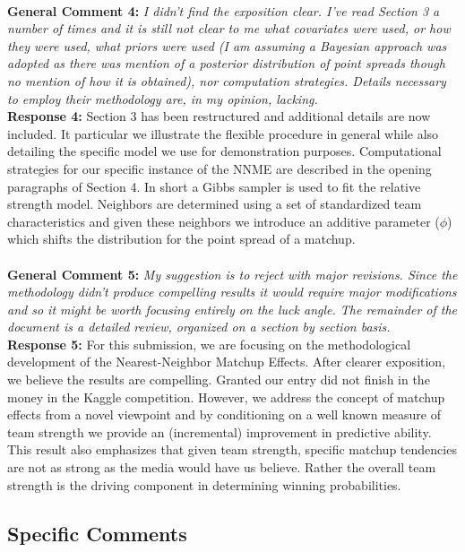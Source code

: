 \documentclass[11pt]{article} %
\begin{document}
\\
{\bf General Comment 4:} \emph{I didn't find the exposition clear. I've read Section 3 a number of times and it is still not clear to me what covariates were used, or how they were used, what priors were used (I am assuming a Bayesian approach was adopted as there was mention of a posterior distribution of point spreads though no mention of how it is obtained), nor computation strategies. Details necessary to employ their methodology are, in my opinion, lacking.}\\
{\bf Response 4:} Section 3 has been restructured and additional details are now included. It particular we illustrate the flexible procedure in general while also detailing the specific model we use for demonstration purposes. Computational strategies for our specific instance of the NNME are described in the opening paragraphs of Section 4. In short a Gibbs sampler is used to fit the relative strength model. Neighbors are determined using a set of standardized team characteristics and given these neighbors we introduce an additive parameter ($\phi$) which shifts the distribution for the point spread of a matchup.\\
\\
{\bf General Comment 5:} \emph{My suggestion is to reject with major revisions. Since the methodology didn't produce compelling results it would require major modifications and so it might be worth focusing entirely on the luck angle. The remainder of the document is a detailed review, organized on a section by section basis.}\\
{\bf Response 5:} For this submission, we are focusing on the methodological development of the Nearest-Neighbor Matchup Effects. After clearer exposition, we believe the results are compelling. Granted our entry did not finish in the money in the Kaggle competition. However, we address the concept of matchup effects from a novel viewpoint and by conditioning on a well known measure of team strength we provide an (incremental) improvement in predictive ability. This result also emphasizes that given team strength, specific matchup tendencies are not as strong as the media would have us believe. Rather the overall team strength is the driving component in determining winning probabilities.\\ 
\subsection*{Specific Comments}
\end{document}
